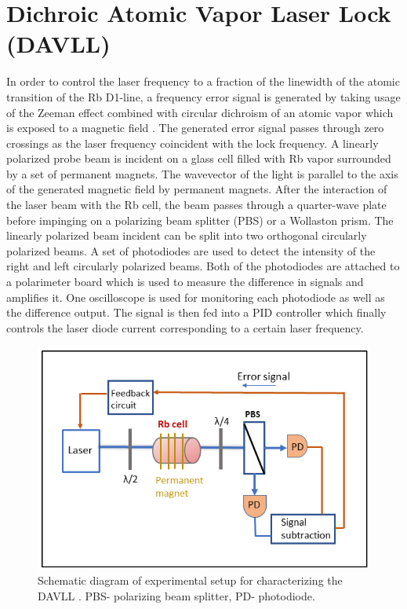 \documentclass[12pt]{report}
\begin{document}
\section{Dichroic Atomic Vapor Laser Lock (DAVLL)}
\medskip
In order to control the laser frequency to a fraction of the linewidth of the atomic transition of the Rb D1-line, a frequency error signal is generated by taking usage of the Zeeman effect combined with circular dichroism of an atomic vapor which is exposed to a magnetic field \cite{doi:10.1063/1.3568824}. The generated error signal passes through zero crossings as the laser frequency coincident with the lock frequency. A linearly polarized probe beam is incident on a glass cell filled with Rb vapor surrounded by a set of permanent magnets. The wavevector of the light is parallel to the axis of the generated magnetic field by permanent magnets. After the interaction of the laser beam with the Rb cell, the beam passes through a quarter-wave plate before impinging on a polarizing beam splitter (PBS) or a Wollaston prism. The linearly polarized beam incident can be split into two orthogonal circularly polarized beams. A set of photodiodes are used to detect the intensity of the right and left circularly polarized beams. Both of the photodiodes are attached to a polarimeter board which is used to measure the difference in signals and amplifies it. One oscilloscope is used for monitoring each photodiode as well as the difference output. The signal is then fed into a PID controller which finally controls the laser diode current corresponding to a certain laser frequency.
\begin{figure}[h]
\centering
\includegraphics[width=0.8\linewidth]{figures/DAVLL}
\caption{Schematic diagram of experimental setup for characterizing the DAVLL . PBS- polarizing beam splitter, PD- photodiode.}
\end{figure}
\end{document}
